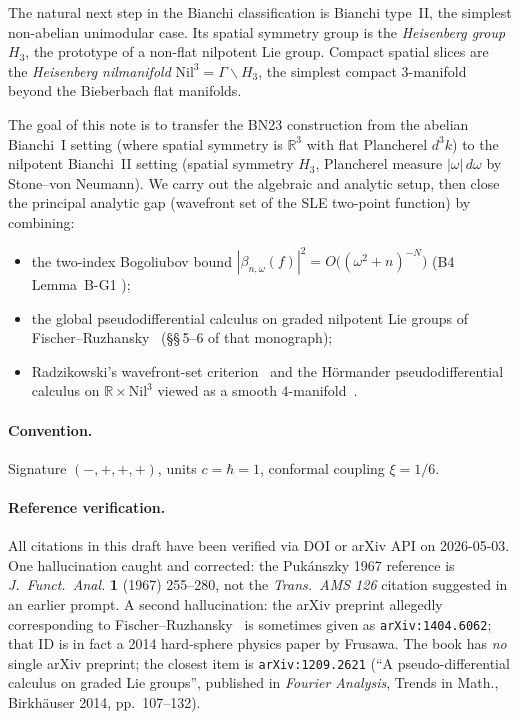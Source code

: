 \documentclass[11pt, a4paper]{article}
\newcommand{\RR}{\mathbb{R}}
\newcommand{\Hgroup}{H_3}
\newcommand{\Nil}{\mathrm{Nil}^3}
\newcommand{\om}{\omega}
\begin{document}
The natural next step in the Bianchi classification is Bianchi type~II,
the simplest non-abelian unimodular case.
Its spatial symmetry group is the \emph{Heisenberg group} $\Hgroup$, the prototype
of a non-flat nilpotent Lie group.
Compact spatial slices are the \emph{Heisenberg nilmanifold} $\Nil = \Gamma \backslash \Hgroup$,
the simplest compact 3-manifold beyond the Bieberbach flat manifolds.

The goal of this note is to transfer the BN23 construction from the abelian
Bianchi~I setting (where spatial symmetry is $\RR^3$ with flat Plancherel
$d^3 k$) to the nilpotent Bianchi~II setting (spatial symmetry $\Hgroup$,
Plancherel measure $|\om|\,d\om$ by Stone--von Neumann).
We carry out the algebraic and analytic setup, then close the principal
analytic gap (wavefront set of the SLE two-point function) by combining:
\begin{itemize}[leftmargin=*]
  \item the two-index Bogoliubov bound
        $|\beta_{n,\om}(f)|^2 = O\bigl((\om^2+n)^{-N}\bigr)$
        (B4 Lemma~B-G1 \cite{LemmaBG1});
  \item the global pseudodifferential calculus on graded nilpotent Lie groups
        of Fischer--Ruzhansky~\cite{FR16} (\S\S\,5--6 of that monograph);
  \item Radzikowski's wavefront-set criterion~\cite{Rad96} and the
        Hörmander pseudodifferential calculus on $\RR \times \Nil$
        viewed as a smooth $4$-manifold~\cite{HormIII}.
\end{itemize}

\paragraph{Convention.}
Signature $(-,+,+,+)$, units $c = \hbar = 1$, conformal coupling $\xi = 1/6$.

\paragraph{Reference verification.}
All citations in this draft have been verified via DOI or arXiv API on
2026-05-03. One hallucination caught and corrected: the Pukánszky 1967
reference is \emph{J.\ Funct.\ Anal.} \textbf{1} (1967) 255--280, not the
\emph{Trans.\ AMS 126} citation suggested in an earlier prompt. A second
hallucination: the arXiv preprint allegedly corresponding to
Fischer--Ruzhansky~\cite{FR16} is sometimes given as \texttt{arXiv:1404.6062};
that ID is in fact a 2014 hard-sphere physics paper by Frusawa. The book has
\emph{no} single arXiv preprint; the closest item is \texttt{arXiv:1209.2621}
(``A pseudo-differential calculus on graded Lie groups'', published in
\emph{Fourier Analysis}, Trends in Math., Birkhäuser 2014, pp.~107--132).
\end{document}
